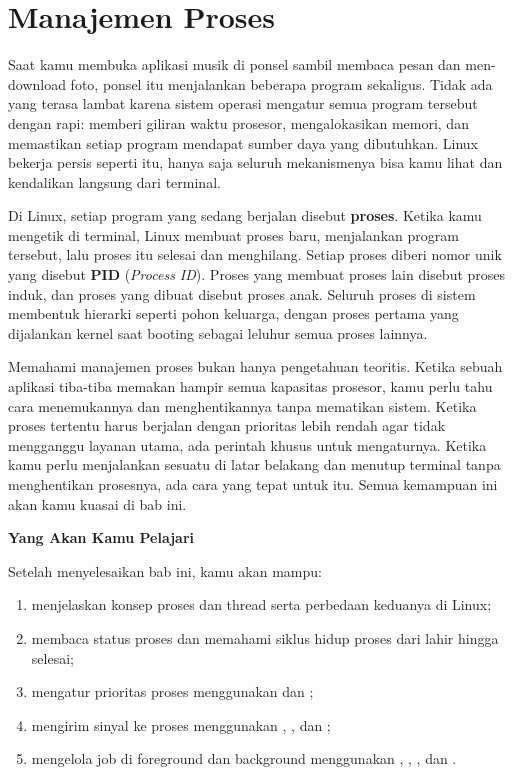 
\chapter{Manajemen Proses}
\label{ch:process-management}

Saat kamu membuka aplikasi musik di ponsel sambil membaca pesan dan men-download foto,
ponsel itu menjalankan beberapa program sekaligus. Tidak ada yang terasa lambat karena
sistem operasi mengatur semua program tersebut dengan rapi: memberi giliran waktu prosesor,
mengalokasikan memori, dan memastikan setiap program mendapat sumber daya yang dibutuhkan.
Linux bekerja persis seperti itu, hanya saja seluruh mekanismenya bisa kamu lihat dan
kendalikan langsung dari terminal.

Di Linux, setiap program yang sedang berjalan disebut \textbf{proses}. Ketika kamu
mengetik  di terminal, Linux membuat proses baru, menjalankan program tersebut,
lalu proses itu selesai dan menghilang. Setiap proses diberi nomor unik yang disebut
\textbf{PID} (\textit{Process ID}). Proses yang membuat proses lain disebut proses induk,
dan proses yang dibuat disebut proses anak. Seluruh proses di sistem membentuk hierarki
seperti pohon keluarga, dengan proses pertama yang dijalankan kernel saat booting sebagai
leluhur semua proses lainnya.

Memahami manajemen proses bukan hanya pengetahuan teoritis. Ketika sebuah aplikasi tiba-tiba
memakan hampir semua kapasitas prosesor, kamu perlu tahu cara menemukannya dan menghentikannya
tanpa mematikan sistem. Ketika proses tertentu harus berjalan dengan prioritas lebih rendah
agar tidak mengganggu layanan utama, ada perintah khusus untuk mengaturnya. Ketika kamu
perlu menjalankan sesuatu di latar belakang dan menutup terminal tanpa menghentikan prosesnya,
ada cara yang tepat untuk itu. Semua kemampuan ini akan kamu kuasai di bab ini.

\textbf{Yang Akan Kamu Pelajari}

Setelah menyelesaikan bab ini, kamu akan mampu:

\begin{enumerate}
    \item menjelaskan konsep proses dan thread serta perbedaan keduanya di Linux;
    \item membaca status proses dan memahami siklus hidup proses dari lahir hingga selesai;
    \item mengatur prioritas proses menggunakan  dan ;
    \item mengirim sinyal ke proses menggunakan , , dan ;
    \item mengelola job di foreground dan background menggunakan , , , dan .
\end{enumerate}

